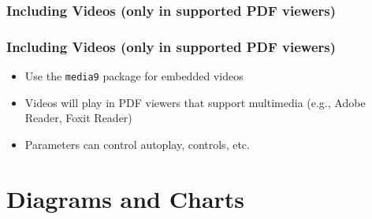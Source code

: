 \documentclass[aspectratio=169,professionalfonts]{beamer}
\begin{document}
\begin{frame}
    \frametitle{Including Videos (only in supported PDF viewers)}

    \begin{center}
    \end{center}

\end{frame}

\begin{frame}
    \frametitle{Including Videos (only in supported PDF viewers)}

    \begin{tcolorbox}[colback=ugmLightGrey,colframe=ugmBlue,title=Video Tip]
        \begin{itemize}
            \item Use the \texttt{media9} package for embedded videos
            \item Videos will play in PDF viewers that support multimedia (e.g., Adobe Reader, Foxit Reader)
            \item Parameters can control autoplay, controls, etc.
        \end{itemize}
    \end{tcolorbox}

\end{frame}
    

\section{Diagrams and Charts}
\end{document}
